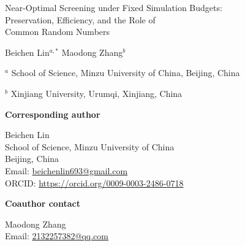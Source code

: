 \documentclass[11pt]{article}
\begin{document}
{\Large\bfseries\raggedright Near-Optimal Screening under Fixed Simulation Budgets:\\[4pt]
Preservation, Efficiency, and the Role of\\[4pt]
Common Random Numbers\par}
\vspace{16pt}
{\large Beichen Lin$^{a,*}$ \qquad Maodong Zhang$^b$\par}
\vspace{8pt}
$^a$ School of Science, Minzu University of China, Beijing, China

$^b$ Xinjiang University, Urumqi, Xinjiang, China
\vspace{14pt}

\textbf{Corresponding author}

Beichen Lin\\
School of Science, Minzu University of China\\
Beijing, China\\
Email: \href{mailto:beichenlin693@gmail.com}{beichenlin693@gmail.com}\\
ORCID: \url{https://orcid.org/0009-0003-2486-0718}
\vspace{8pt}

\textbf{Coauthor contact}

Maodong Zhang\\
Email: \href{mailto:2132257382@qq.com}{2132257382@qq.com}
\end{document}
